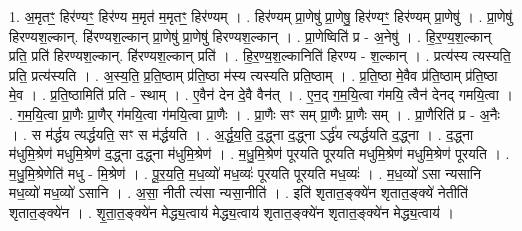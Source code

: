 \documentclass[17pt]{extarticle}
\begin{document}
1. अ॒मृतꣳ॒॒ हिर॑ण्यꣳ॒॒ हिर॑ण्य म॒मृत॑ म॒मृतꣳ॒॒ हिर॑ण्यम् । . हिर॑ण्यम् प्रा॒णेषु॑ प्रा॒णेषु॒ हिर॑ण्यꣳ॒॒ हिर॑ण्यम् प्रा॒णेषु॑ । . प्रा॒णेषु॑ हिरण्यश॒ल्कान्. हि॑रण्यश॒ल्कान् प्रा॒णेषु॑ प्रा॒णेषु॑ हिरण्यश॒ल्कान् । . प्रा॒णेष्विति॑ प्र - अ॒नेषु॑ । . हि॒र॒ण्य॒श॒ल्कान् प्रति॒ प्रति॑ हिरण्यश॒ल्कान्. हि॑रण्यश॒ल्कान् प्रति॑ । . हि॒र॒ण्य॒श॒ल्कानिति॑ हिरण्य - श॒ल्कान् । . प्रत्य॑स्य त्यस्यति॒ प्रति॒ प्रत्य॑स्यति । . अ॒स्य॒ति॒ प्र॒ति॒ष्ठाम् प्र॑ति॒ष्ठा म॑स्य त्यस्यति प्रति॒ष्ठाम् । . प्र॒ति॒ष्ठा मे॒वैव प्र॑ति॒ष्ठाम् प्र॑ति॒ष्ठा मे॒व । . प्र॒ति॒ष्ठामिति॑ प्रति - स्थाम् । . ए॒वैन॑ देन दे॒वै वैन॑त् । . ए॒न॒द् ग॒म॒यि॒त्वा ग॑मयि॒ त्वैन॑ देनद् गमयि॒त्वा । . ग॒म॒यि॒त्वा प्रा॒णैः प्रा॒णैर् ग॑मयि॒त्वा ग॑मयि॒त्वा प्रा॒णैः । . प्रा॒णैः सꣳ सम् प्रा॒णैः प्रा॒णैः सम् । . प्रा॒णैरिति॑ प्र - अ॒नैः । . स म॑र्द्धय त्यर्द्धयति॒ सꣳ स म॑र्द्धयति । . अ॒र्द्ध॒य॒ति॒ द॒द्ध्ना द॒द्ध्ना ऽर्द्ध॑य त्यर्द्धयति द॒द्ध्ना । . द॒द्ध्ना म॑धुमि॒श्रेण॑ मधुमि॒श्रेण॑ द॒द्ध्ना द॒द्ध्ना म॑धुमि॒श्रेण॑ । . म॒धु॒मि॒श्रेण॑ पूरयति पूरयति मधुमि॒श्रेण॑ मधुमि॒श्रेण॑ पूरयति । . म॒धु॒मि॒श्रेणेति॑ मधु - मि॒श्रेण॑ । . पू॒र॒य॒ति॒ म॒ध॒व्यो॑ मध॒व्यः॑ पूरयति पूरयति मध॒व्यः॑ । . म॒ध॒व्यो॑ ऽसा न्यसानि मध॒व्यो॑ मध॒व्यो॑ ऽसानि । . अ॒सा॒ नीती त्य॑सा न्यसा॒नीति॑ । . इति॑ शृतात॒ङ्क्ये॑न शृतात॒ङ्क्ये॑ नेतीति॑ शृतात॒ङ्क्ये॑न । . शृ॒ता॒त॒ङ्क्ये॑न मेद्ध्य॒त्वाय॑ मेद्ध्य॒त्वाय॑ शृतात॒ङ्क्ये॑न शृतात॒ङ्क्ये॑न मेद्ध्य॒त्वाय॑ । \newline
\end{document}
